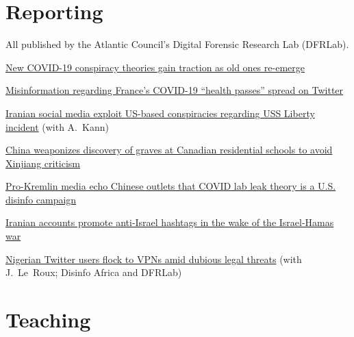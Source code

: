 \documentclass[11pt,letterpaper]{article}
\begin{document}
\section{Reporting}

All published by the Atlantic Council's Digital Forensic Research Lab (DFRLab).

\begin{tight}
  \item \href{https://medium.com/dfrlab/new-covid-19-conspiracy-theories-gain-traction-as-old-ones-re-emerge-c28e58539198}{New COVID-19 conspiracy theories gain traction as old ones re-emerge}
  \item \href{https://medium.com/dfrlab/misinformation-regarding-frances-covid-19-health-passes-spread-on-twitter-ba344920bc16}{Misinformation regarding France's COVID-19 ``health passes'' spread on Twitter}
  \item \href{https://medium.com/dfrlab/iranian-social-media-exploit-us-based-conspiracies-regarding-uss-liberty-incident-95bc8960dcfa}{Iranian social media exploit US-based conspiracies regarding USS Liberty incident} (with A.~Kann)
  \item \href{https://medium.com/dfrlab/china-weaponizes-discovery-of-graves-at-canadian-residential-schools-to-avoid-xinjiang-criticism-6bf618a6e954}{China weaponizes discovery of graves at Canadian residential schools to avoid Xinjiang criticism}
  \item \href{https://medium.com/dfrlab/pro-kremlin-media-echo-chinese-outlets-that-covid-lab-leak-theory-is-a-u-s-disinfo-campaign-7f1bdc28f0a4}{Pro-Kremlin media echo Chinese outlets that COVID lab leak theory is a U.S. disinfo campaign}
  \item \href{https://medium.com/dfrlab/iranian-accounts-promote-anti-israel-hashtags-in-the-wake-of-the-israel-hamas-war-c1240ec25152}{Iranian accounts promote anti-Israel hashtags in the wake of the Israel-Hamas war}
  \item \href{https://medium.com/dfrlab/nigerian-twitter-users-flock-to-vpns-amid-dubious-legal-threats-395101f95cd3}{Nigerian Twitter users flock to VPNs amid dubious legal threats} (with J.~Le~Roux; Disinfo Africa and DFRLab)
\end{tight}

\section{Teaching}
\end{document}
